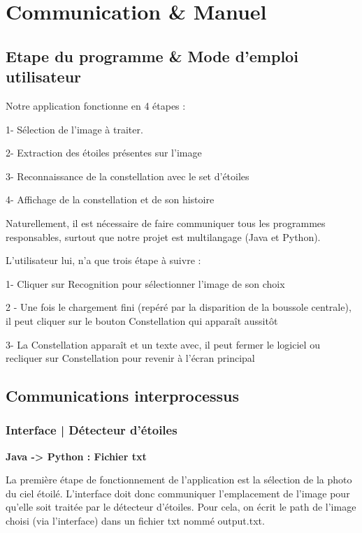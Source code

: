 \section{Communication \& Manuel}

\subsection{Etape du programme \& Mode d'emploi utilisateur}

\noindent Notre application fonctionne en 4 étapes :


1- Sélection de l'image à traiter.

2- Extraction des étoiles présentes sur l'image

3- Reconnaissance de la constellation avec le set d'étoiles

4- Affichage de la constellation et de son histoire

\noindent Naturellement, il est nécessaire de faire communiquer tous les programmes responsables, surtout que notre projet est multilangage (Java et Python).

\vspace{0.2cm}

\noindent L'utilisateur lui, n'a que trois étape à suivre :

1- Cliquer sur Recognition pour sélectionner l'image de son choix

2 - Une fois le chargement fini (repéré par la disparition de la boussole centrale), il peut cliquer sur le bouton Constellation qui apparaît aussitôt

3- La Constellation apparaît et un texte avec, il peut fermer le logiciel ou recliquer sur Constellation pour revenir à l'écran principal

\subsection{Communications interprocessus}

\subsubsection{Interface | Détecteur d'étoiles}

\noindent \textbf{Java -> Python : Fichier txt}

\vspace{0.2cm}

\noindent La première étape de fonctionnement de l'application est la sélection de la photo du ciel étoilé.
\noindent L'interface doit donc communiquer l'emplacement de l'image pour qu'elle soit traitée par le détecteur d'étoiles.
\noindent Pour cela, on écrit le path de l'image choisi (via l'interface) dans un fichier txt nommé output.txt.


